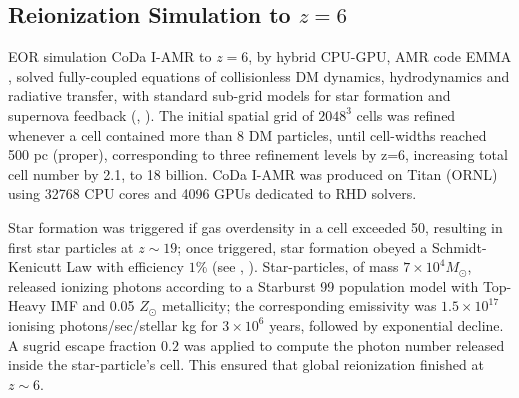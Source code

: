 \documentclass[twocolumn]{aastex61}
\begin{document}



\subsection{Reionization Simulation to $z = 6$}
EOR simulation CoDa I-AMR to $z = 6$, by hybrid CPU-GPU, AMR code EMMA \citep{AUB15}, solved fully-coupled equations of collisionless DM dynamics, hydrodynamics and radiative transfer, with standard sub-grid models for star formation and supernova feedback (\citet{RAS06}, \citet{DEP17}). 
The initial spatial grid of $2048^3$ cells was refined whenever a cell contained more than 8 DM particles, until cell-widths reached 500 pc (proper), corresponding to three refinement levels by z=6, increasing total cell number by 2.1, to 18 billion.   CoDa I-AMR was produced on Titan (ORNL) using 32768 CPU cores and 4096 GPUs dedicated to RHD solvers.

Star formation was triggered if gas overdensity in a cell exceeded 50, resulting in first star particles at $z\sim 19$; once triggered, star formation obeyed a Schmidt-Kenicutt Law with efficiency $1\%$ (see \citet{RAS06}, \citet{DEP17}). Star-particles, of mass  $7\times 10^4 M_\odot$, released ionizing photons according to a Starburst 99 population model \citep{LEI99} with Top-Heavy IMF and 0.05 $Z_\odot$ metallicity; the corresponding emissivity was $1.5\times 10^{17}$ ionising photons/sec/stellar kg for $3\times 10^6$ years, followed by exponential decline. A sugrid escape fraction $0.2$ was applied to compute the photon number released inside the star-particle's cell.  
This ensured that global reionization finished at $z\sim 6$.  
\end{document}
